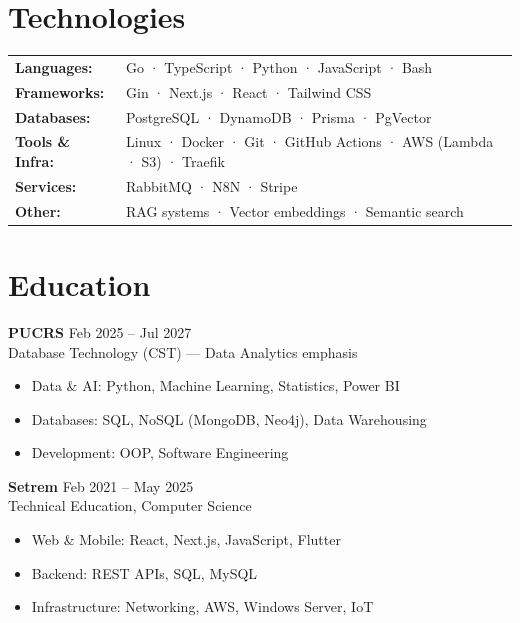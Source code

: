 \documentclass[a4paper,11pt]{article}
\begin{document}
\section{Technologies}

\begin{tabular}{@{} l l}
  \textbf{Languages:} & Go · TypeScript · Python · JavaScript · Bash \\
  \textbf{Frameworks:} & Gin · Next.js · React · Tailwind CSS \\
  \textbf{Databases:} & PostgreSQL · DynamoDB · Prisma · PgVector \\
  \textbf{Tools \& Infra:} & Linux · Docker · Git · GitHub Actions · AWS (Lambda · S3) · Traefik \\
  \textbf{Services:} & RabbitMQ · N8N · Stripe \\
  \textbf{Other:} & RAG systems · Vector embeddings · Semantic search \\
\end{tabular}

\section{Education}

\textbf{PUCRS} \hfill {\small Feb 2025 -- Jul 2027} \\
{\small Database Technology (CST) --- Data Analytics emphasis}
\begin{itemize}
  \item Data \& AI: Python, Machine Learning, Statistics, Power BI
  \item Databases: SQL, NoSQL (MongoDB, Neo4j), Data Warehousing
  \item Development: OOP, Software Engineering
\end{itemize}

\vspace{0.3em}
\textbf{Setrem} \hfill {\small Feb 2021 -- May 2025} \\
{\small Technical Education, Computer Science}
\begin{itemize}
  \item Web \& Mobile: React, Next.js, JavaScript, Flutter
  \item Backend: REST APIs, SQL, MySQL
  \item Infrastructure: Networking, AWS, Windows Server, IoT
\end{itemize}
\end{document}

